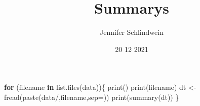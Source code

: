 \documentclass[
]{article}
\title{Summarys}
\author{Jennifer Schlindwein}
\date{20 12 2021}
\newenvironment{Shaded}{\begin{snugshade}}{\end{snugshade}}
\newcommand{\AttributeTok}[1]{\textcolor[rgb]{0.77,0.63,0.00}{#1}}
\newcommand{\ControlFlowTok}[1]{\textcolor[rgb]{0.13,0.29,0.53}{\textbf{#1}}}
\newcommand{\FunctionTok}[1]{\textcolor[rgb]{0.00,0.00,0.00}{#1}}
\newcommand{\NormalTok}[1]{#1}
\newcommand{\OtherTok}[1]{\textcolor[rgb]{0.56,0.35,0.01}{#1}}
\newcommand{\StringTok}[1]{\textcolor[rgb]{0.31,0.60,0.02}{#1}}
\begin{document}
\maketitle

\begin{Shaded}
\begin{Highlighting}[]
\ControlFlowTok{for}\NormalTok{ (filename }\ControlFlowTok{in} \FunctionTok{list.files}\NormalTok{(}\StringTok{\textquotesingle{}data\textquotesingle{}}\NormalTok{))\{}
  \FunctionTok{print}\NormalTok{(}\StringTok{\textquotesingle{}{-}{-}{-}{-}{-}{-}{-}{-}{-}{-}{-}{-}{-}{-}{-}{-}{-}{-}{-}{-}{-}{-}{-}{-}{-}{-}{-}{-}{-}{-}{-}{-}{-}{-}{-}{-}{-}{-}{-}{-}{-}{-}{-}{-}{-}{-}{-}{-}{-}{-}{-}{-}{-}{-}{-}{-}{-}{-}\textquotesingle{}}\NormalTok{)}
  \FunctionTok{print}\NormalTok{(filename)}
\NormalTok{  dt }\OtherTok{\textless{}{-}} \FunctionTok{fread}\NormalTok{(}\FunctionTok{paste}\NormalTok{(}\StringTok{\textquotesingle{}data/\textquotesingle{}}\NormalTok{,filename,}\AttributeTok{sep=}\StringTok{\textquotesingle{}\textquotesingle{}}\NormalTok{))}
  \FunctionTok{print}\NormalTok{(}\FunctionTok{summary}\NormalTok{(dt))}
\NormalTok{\}}
\end{Highlighting}
\end{Shaded}
\end{document}
